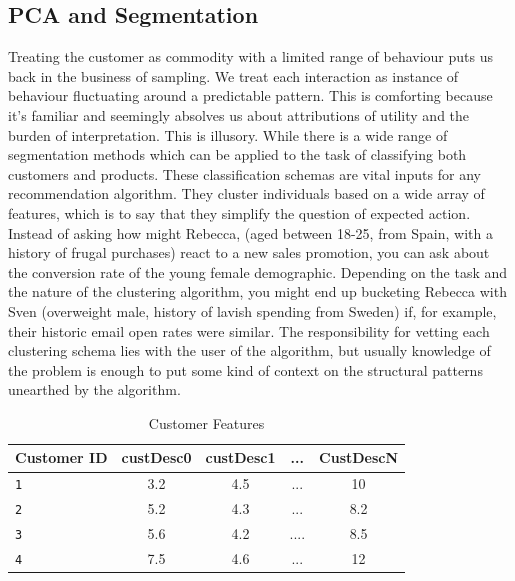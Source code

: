 \documentclass{tufte-handout}
\begin{document}
\subsection{PCA and Segmentation}
Treating the customer as commodity with a limited range of behaviour puts us back in the business of sampling. We treat each interaction as instance of behaviour fluctuating around a predictable pattern. This is comforting because it's familiar and seemingly absolves us about attributions of utility and the burden of interpretation. This is illusory. While there is a wide range of segmentation methods which can be applied to the task of classifying both customers and products. These classification schemas are vital inputs for any recommendation algorithm. They cluster individuals based on a wide array of features, which is to say that they simplify the question of expected action. Instead of asking how might Rebecca, (aged between 18-25, from Spain, with a history of frugal purchases) react to a new sales promotion, you can ask about the conversion rate of the young female demographic. Depending on the task and the nature of the clustering algorithm, you might end up bucketing Rebecca with Sven (overweight male, history of lavish spending from Sweden) if, for example, their historic email open rates were similar. The responsibility for vetting each clustering schema lies with the user of the algorithm, but usually knowledge of the problem is enough to put some kind of context on the structural patterns unearthed by the algorithm. 
\linebreak

\begin{table}[htb]
\centering
\sffamily
\caption*{Customer Features}
\begin{tabular}{l*{4}{c}}
\toprule
 \bfseries Customer ID & \bfseries custDesc0 & \bfseries custDesc1 & \bfseries ... & \bfseries CustDescN \\
\midrule
\texttt{1}      & 3.2               & 4.5                 & ...                 & 10               \\
\texttt{2}   & 5.2               & 4.3                 & ...                  & 8.2              \\
\texttt{3} & 5.6              & 4.2                 & ....                & 8.5              \\
\texttt{4}     & 7.5              & 4.6                 & ...                 & 12               \\ \bottomrule
\end{tabular}
\end{table}
\end{document}
